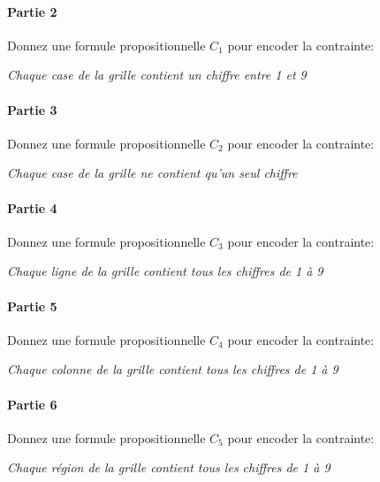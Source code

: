 \documentclass[12pt,french,a4paper]{article}
\begin{document}
\begin{question}
\paragraph{Partie 2}

Donnez une formule propositionnelle $C_1$ pour encoder la contrainte:
\begin{center}
\og \textit{Chaque case de la grille contient un chiffre entre 1 et 9} \fg{}
\end{center}

\paragraph{Partie 3}

Donnez une formule propositionnelle $C_2$ pour encoder la contrainte:
\begin{center}
\og \textit{Chaque case de la grille ne contient qu'un seul chiffre} \fg{}
\end{center}

\paragraph{Partie 4}

Donnez une formule propositionnelle $C_3$ pour encoder la contrainte:
\begin{center}
\og \textit{Chaque ligne de la grille contient tous les chiffres de 1 à 9} \fg{}
\end{center}

\paragraph{Partie 5}

Donnez une formule propositionnelle $C_4$ pour encoder la contrainte:
\begin{center}
\og \textit{Chaque colonne de la grille contient tous les chiffres de 1 à 9} \fg{}
\end{center}

\paragraph{Partie 6}

Donnez une formule propositionnelle $C_5$ pour encoder la contrainte:
\begin{center}
\og \textit{Chaque région de la grille contient tous les chiffres de 1 à 9} \fg{}
\end{center}


\end{question}
\end{document}
